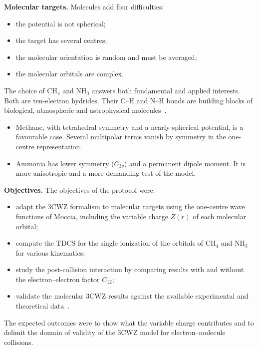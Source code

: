 \documentclass[11pt,a4paper]{article}
\newcommand{\NH}{NH$_3$}
\newcommand{\CH}{CH$_4$}
\begin{document}
\textbf{Molecular targets.} Molecules add four difficulties:
\begin{itemize}
\item the potential is not spherical;
\item the target has several centres;
\item the molecular orientation is random and must be averaged;
\item the molecular orbitals are complex.
\end{itemize}
The choice of \CH{} and \NH{} answers both fundamental and applied interests. Both are
ten-electron hydrides. Their C--H and N--H bonds are building blocks of biological, atmospheric
and astrophysical molecules~\cite{Pimblott2007,Janev2002,Herbst2009}.
\begin{itemize}
\item Methane, with tetrahedral symmetry and a nearly spherical potential, is a favourable case.
  Several multipolar terms vanish by symmetry in the one-centre representation.
\item Ammonia has lower symmetry ($C_{3v}$) and a permanent dipole moment. It is more anisotropic
  and a more demanding test of the model.
\end{itemize}

\textbf{Objectives.} The objectives of the protocol were:
\begin{itemize}
\item[O1.] adapt the 3CWZ formalism to molecular targets using the one-centre wave functions of
  Moccia, including the variable charge $Z(r)$ of each molecular orbital;
\item[O2.] compute the TDCS for the single ionization of the orbitals of \CH{} and \NH{} for
  various kinematics;
\item[O3.] study the post-collision interaction by comparing results with and without the
  electron--electron factor $C_{12}$;
\item[O4.] validate the molecular 3CWZ results against the available experimental and theoretical
  data~\cite{LahmamBennani2009,Isik2016,Chaluvadi2014,Rejoub2001,Nixon2013}.
\end{itemize}
The expected outcomes were to show what the variable charge contributes and to delimit the domain
of validity of the 3CWZ model for electron--molecule collisions.
\end{document}
